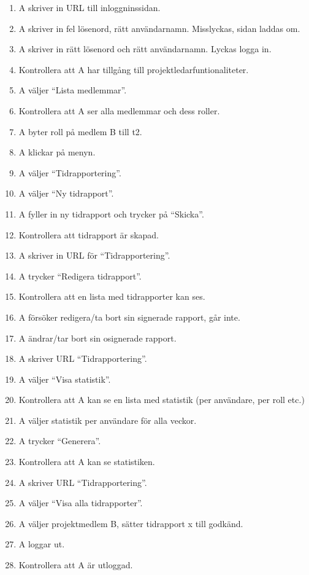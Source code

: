 \documentclass[a4paper]{article}
\begin{document}
\begin{ST}
\begin{enumerate}
\item A skriver in URL till inloggninssidan.
\item A skriver in fel lösenord, rätt användarnamn. Misslyckas, sidan laddas om.
\item A skriver in rätt lösenord och rätt användarnamn. Lyckas logga in.
\item Kontrollera att A har tillgång till projektledarfuntionaliteter.
\item A väljer ``Lista medlemmar''.
\item Kontrollera att A ser alla medlemmar och dess roller.
\item A byter roll på medlem B till t2.
\item A klickar på menyn.
\item A väljer ``Tidrapportering''.
\item A väljer ``Ny tidrapport''.
\item A fyller in ny tidrapport och trycker på ``Skicka''.
\item Kontrollera att tidrapport är skapad.
\item A skriver in URL för ``Tidrapportering''.
\item A trycker ``Redigera tidrapport''.
\item Kontrollera att en lista med tidrapporter kan ses.
\item A försöker redigera/ta bort sin signerade rapport, går inte.
\item A ändrar/tar bort sin osignerade rapport.
\item A skriver URL ``Tidrapportering''.
\item A väljer ``Visa statistik''.
\item Kontrollera att A kan se en lista med statistik (per användare, per roll etc.)
\item A väljer statistik per användare för alla veckor.
\item A trycker ``Generera''.
\item Kontrollera att A kan se statistiken.
\item A skriver URL ``Tidrapportering''.
\item A väljer ``Visa alla tidrapporter''.
\item A väljer projektmedlem B, sätter tidrapport x till godkänd.
\item A loggar ut.
\item Kontrollera att A är utloggad.



\end{enumerate}

\end{ST}
\end{document}
